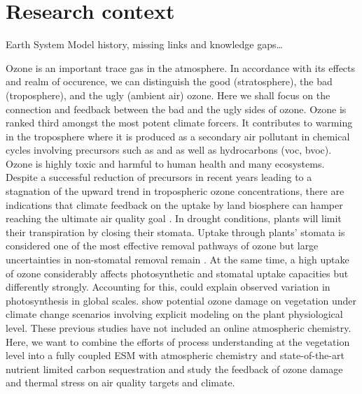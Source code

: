 \documentclass[11pt, a4paper, oneside, article]{memoir}
\newcommand{\pcite}[1]{\parencite{#1}}
\begin{document}


\chapter{Research context}
Earth System Model history, missing links and knowledge gaps…

Ozone is an important trace gas in the atmosphere. In accordance with its effects and realm of occurence, we can distinguish the good (stratosphere), the bad (troposphere), and the ugly (ambient air) ozone. Here we shall focus on the connection and feedback between the bad and the ugly sides of ozone. Ozone is ranked third amongst the most potent climate forcers. It contributes to warming in the troposphere where it is produced as a secondary air pollutant in chemical cycles involving precursors such as  and  as well as hydrocarbons (\gls{voc}, \gls{bvoc}). Ozone is highly toxic and harmful to human health and many ecosystems. Despite a successful reduction of precursors in recent years leading to a stagnation of the upward trend in tropospheric ozone concentrations, there are indications that climate feedback on the uptake by land biosphere can hamper reaching the ultimate air quality goal \pcite{NCC:Lin2020}. In drought conditions, plants will limit their transpiration by closing their stomata. Uptake through plants’ stomata is considered one of the most effective removal pathways of ozone but large uncertainties in non-stomatal removal remain \pcite{RG:Clifton2020}. At the same time, a high uptake of ozone considerably affects photosynthetic and stomatal uptake capacities but differently strongly. Accounting for this, \cite{BGS:Lombardozzi2013} could explain observed variation in photosynthesis in global scales. \cite{BGSD:Franz2020} show potential ozone damage on vegetation under climate change scenarios involving explicit modeling on the plant physiological level. These previous studies have not included an online atmospheric chemistry. Here, we want to combine the efforts of process understanding at the vegetation level into a fully coupled ESM with atmospheric chemistry and state-of-the-art nutrient limited carbon sequestration and study the feedback of ozone damage and thermal stress on air quality targets and climate.
\end{document}
